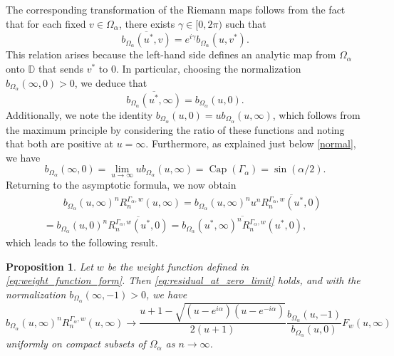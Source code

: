 \documentclass[12pt,oneside,reqno]{amsart}
\newtheorem{proposition}[theorem]{Proposition}
\theoremstyle{definition}
\numberwithin{equation}{section}
\renewcommand{\Cap}{\operatorname{Cap}}
\begin{document}
The corresponding transformation of the Riemann maps follows from the fact that for each fixed \( v \in \Omega_\alpha \), there exists \( \gamma \in [0, 2\pi) \) such that  
\begin{equation}
\label{b*}
   \overline{b_{\Omega_\alpha}(u^*, v)} = e^{i\gamma} b_{\Omega_\alpha}(u, v^*).
\end{equation}
This relation arises because the left-hand side defines an analytic map from \( \Omega_\alpha \) onto \( \mathbb{D} \) that sends \( v^* \) to \( 0 \).  
In particular, choosing the normalization \( b_{\Omega_\alpha}(\infty, 0) > 0 \), we deduce that  
\begin{equation}
\label{b0}
   \overline{b_{\Omega_\alpha}(u^*, \infty)} = b_{\Omega_\alpha}(u, 0).
\end{equation}
Additionally, we note the identity  
   $b_{\Omega_\alpha}(u, 0) = u b_{\Omega_\alpha}(u, \infty)$,
which follows from the maximum principle by considering the ratio of these functions and noting that both are positive at \( u = \infty \). Furthermore, as explained just below \eqref{normal}, we have 
\begin{equation}
\label{ca}
   b_{\Omega_\alpha}(\infty, 0) = \lim_{u\to\infty} ub_{\Omega_\alpha}(u, \infty) =  
   \Cap(\Gamma_\alpha)=\sin(\alpha/2).
\end{equation}    
Returning to the asymptotic formula, we now obtain
\begin{multline}
	\qquad b_{\Omega_\alpha}(u,\infty)^nR_{n}^{\Gamma_\alpha,w}(u,\infty) 
	= b_{\Omega_\alpha}(u,\infty)^nu^n\overline{R_{n}^{\Gamma_\alpha,w}(u^\ast,0) }  \\
	= b_{\Omega_\alpha}(u,0)^n \overline{R_{n}^{\Gamma_\alpha,w}(u^\ast,0) } 
	= \overline{b_{\Omega_{\alpha}}(u^\ast,\infty)^nR_{n}^{\Gamma_\alpha,w}(u^\ast,0) }, \qquad
\end{multline}
which leads to the following result.
\begin{proposition}
Let $w$ be the weight function defined in \eqref{eq:weight_function_form}. Then \eqref{eq:residual_at_zero_limit} holds, and with the normalization $b_{\Omega_\alpha}(\infty,-1)>0$, we have
\begin{equation}
	b_{\Omega_{\alpha}}(u,\infty)^nR_{n}^{\Gamma_\alpha,w}(u,\infty)\longrightarrow 
	\frac{u+1-\sqrt{(u-e^{i\alpha})(u-e^{-i\alpha})}}{2(u+1)}
	\frac{b_{\Omega_\alpha}(u,-1)}{b_{\Omega_\alpha}(u,0)}F_w(u,\infty)
	\label{eq:residual_at_infinity_limit}
\end{equation}
uniformly on compact subsets of $\Omega_\alpha$ as $n\rightarrow \infty$.
\end{proposition}
\end{document}
